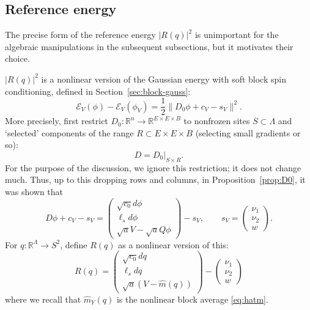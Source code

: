 \documentclass[11pt]{article}
\newcommand{\R}{\mathbb R}
\numberwithin{equation}{section}
\theoremstyle{definition}
\theoremstyle{plain}
\begin{document}
\subsection{Reference energy}

The precise form of the reference energy $|R(q)|^2$ is unimportant for the algebraic manipulations
in the subsequent subsections, but it motivates their choice.

$|R(q)|^2$ is a nonlinear version of the Gaussian energy with soft block spin conditioning,
defined in Section~\ref{sec:block-gauss}:
\begin{equation}
  \mathcal E_V(\phi) - \mathcal E_V(\phi_V) = \frac12 \|D_0\phi+c_V-s_V\|^2.
\end{equation}
More precisely, first restrict $D_0: \R^{n} \to \R^{E \times E \times B}$ 
to nonfrozen sites $S \subset \Lambda$ and `selected' components of the range $R\subset E\times E \times B$
(selecting small gradients or so):
\begin{equation}
D = D_0|_{S\times R}.
\end{equation}
%
For the purpose of the discussion, we ignore this restriction; it does not change much.
Thus, up to this dropping rows and columns,
in Proposition~\ref{prop:D0}, it was shown that
\begin{equation}
D\phi +c_V -s_V = \begin{pmatrix}
  \sqrt{c_0} d\phi\\
  \ell_s d\phi\\
  \sqrt{a}V -\sqrt{a}Q\phi
\end{pmatrix}
-s_V,
  \qquad
  s_V = \begin{pmatrix}
    \nu_1 \\ \nu_2 \\ w
  \end{pmatrix}
.
\end{equation}
%
For $q: \R^\Lambda  \to S^2$, define $R(q)$ as a nonlinear version of this:
\begin{equation}
  R(q) = \begin{pmatrix}
  \sqrt{c_0} dq\\
  \ell_s dq\\
  \sqrt{a}(V-\widehat m(q))
  \end{pmatrix}
  - \begin{pmatrix}
    \nu_1 \\ \nu_2 \\ w
  \end{pmatrix}
\end{equation}
where we recall that $\widehat m_Y(q)$ is the nonlinear block average \eqref{eq:hatm}.
\end{document}
